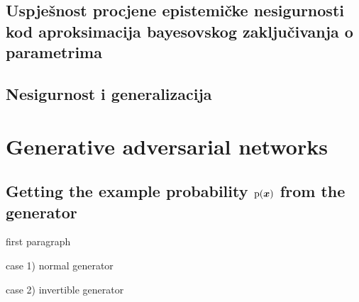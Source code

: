 \documentclass{article}
\begin{document}
\subsection{Uspješnost procjene epistemičke nesigurnosti kod aproksimacija bayesovskog zaključivanja o parametrima}


\subsection{Nesigurnost i  generalizacija}


\section{Generative adversarial networks}

\subsection{Getting the example probability $\p(\vec x)$ from the generator}

first paragraph

case 1) normal generator

case 2) invertible generator
\end{document}

